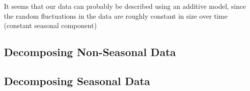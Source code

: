 \documentclass[11pt, a4paper]{article} %
\begin{document}
It seems that our data can probably be described using an additive model, since the random fluctuations in the data are roughly constant in size over time (constant seasonal component)

\subsection{Decomposing Non-Seasonal Data}%

\subsection{Decomposing Seasonal Data}%
\end{document}
